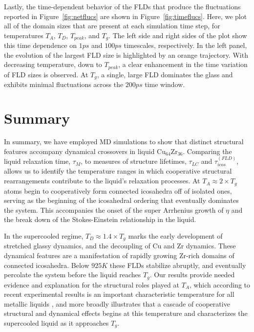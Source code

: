\documentclass[aps,prl,preprint,showpacs,amsmath,floatfix,superscriptaddress]{revtex4}
\begin{document}
Lastly, the time-dependent behavior of the FLDs that produce the
fluctuations reported in Figure~\ref{fig:netflucs} are shown in
Figure~\ref{fig:timeflucs}. Here, we plot all of the domain sizes
that are present at each simulation time step, for temperatures
$T_{A}$, $T_{D}$, $T_{peak}$, and $T_{g}$. The left side and right
sides of the plot show this time dependence on $1ps$ and $100ps$
timescales, respectively. In the left panel, the evolution of the
largest FLD size is highlighted by an orange trajectory. With
decreasing temperature, down to $T_{peak}$, a clear enhancement in
the time variation of FLD sizes is observed. At $T_{g}$, a single,
large FLD dominates the glass and exhibits minimal fluctuations
across the $200ps$ time window.

\section{Summary}

In summary, we have employed MD simulations to show that distinct
structural features accompany dynamical crossovers in liquid
$\mathrm{Cu_{64}Zr_{36}}$. Comparing the liquid relaxation time,
$\tau_{M}$, to measures of structure lifetimes, $\tau_{LC}$ and
$\tau^{(FLD)}_{icos}$, allows us to identify the temperature
ranges in which cooperative structural rearrangements contribute
to the liquid's relaxation processes. At $T_{A} \approx 2\times
T_{g}$  atoms begin to cooperatively form connected icosahedra off
of isolated ones, serving as the beginning of the icosahedral
ordering that eventually dominates the system. This accompanies
the onset of the super Arrhenius growth of $\eta$ and the break
down of the Stokes-Einstein relationship in the liquid.

In the supercooled regime, $T_{D}\approx 1.4 \times T_{g}$ marks
the early development of stretched glassy dynamics, and the
decoupling of Cu and Zr dynamics. These dynamical features are a
manifestation of rapidly growing Zr-rich domains of connected
icosahedra. Below $925K$ these FLDs stabilize abruptly, and
eventually percolate the system before the liquid reaches $T_{g}$.
Our results provide needed evidence and explanation for the
structural roles played at $T_{A}$, which according to recent
experimental results is an important characteristic temperature
for all metallic liquids \cite{Kelton2014}, and more broadly
illustrates that a cascade of cooperative structural and dynamical
effects begins at this temperature and characterizes the
supercooled liquid as it approaches $T_{g}$.
\end{document}
